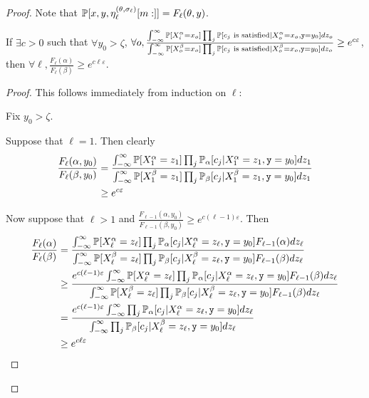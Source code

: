 \begin{proof}
Note that $\mathbb{P}[x, y, \eta_\ell^{(\theta, \sigma_\ell)}[m:]]=F_\ell(\theta, y)$.


\begin{lemma}\label{leakingcycleprivacyviolationlemma}
	If $\exists c>0$ such that $\forall y_0>\zeta$, $\forall o, \frac{\int_{-\infty}^\infty\mathbb{P}[X_i^\alpha=x_o]\prod_j \mathbb{P}[c_j\text{ is satisfied}|X_o^\alpha = x_o, \texttt{y}=y_0]dz_o}{\int_{-\infty}^\infty\mathbb{P}[X_o^\beta=x_o]\prod_j \mathbb{P}[c_j\text{ is satisfied}|X_o^\beta = x_o, \texttt{y}=y_0]dz_o}\geq e^{c\varepsilon}$, then $\forall \ell, \frac{F_\ell(\alpha)}{F_\ell(\beta)}\geq e^{c\ell\varepsilon}$. 
\end{lemma}
\begin{proof}
	This follows immediately from induction on $\ell$:

	Fix $y_0> \zeta$. 

	Suppose that $\ell = 1$. Then clearly \begin{align*}
		\frac{F_\ell(\alpha, y_0)}{F_\ell(\beta, y_0)} &= \frac{\int_{-\infty}^\infty \mathbb{P}[X_1^\alpha=z_1]\prod_j \mathbb{P}_\alpha[c_j|X_1^\alpha = z_1, \texttt{y}=y_0]dz_1}{\int_{-\infty}^\infty \mathbb{P}[X_1^\beta=z_1]\prod_j \mathbb{P}_\beta[c_j|X_1^\beta = z_1, \texttt{y}=y_0]dz_1}\\
		&\geq e^{c\varepsilon}
	\end{align*}

	Now suppose that $\ell>1$ and $\frac{F_{\ell-1}(\alpha, y_0)}{F_{\ell-1}(\beta, y_0)}\geq e^{c(\ell-1)\varepsilon}$. Then \begin{align*}
		\frac{F_\ell(\alpha)}{F_\ell(\beta)} &= \frac{\int_{-\infty}^\infty \mathbb{P}[X_\ell^\alpha=z_\ell]\prod_j \mathbb{P}_\alpha[c_j|X_\ell^\alpha = z_\ell, \texttt{y}=y_0]F_{\ell-1}(\alpha)dz_\ell}{\int_{-\infty}^\infty \mathbb{P}[X_\ell^\beta=z_\ell]\prod_j \mathbb{P}_\beta[c_j|X_\ell^\beta = z_\ell, \texttt{y}=y_0]F_{\ell-1}(\beta)dz_\ell}\\
		&\geq \frac{e^{c(\ell-1)\varepsilon}\int_{-\infty}^\infty \mathbb{P}[X_\ell^\alpha=z_\ell]\prod_j \mathbb{P}_\alpha[c_j|X_\ell^\alpha = z_\ell, \texttt{y}=y_0]F_{\ell-1}(\beta)dz_\ell}{\int_{-\infty}^\infty \mathbb{P}[X_\ell^\beta=z_\ell]\prod_j \mathbb{P}_\beta[c_j|X_\ell^\beta = z_\ell, \texttt{y}=y_0]F_{\ell-1}(\beta)dz_\ell}\\
		&= \frac{e^{c(\ell-1)\varepsilon}\int_{-\infty}^\infty \prod_j \mathbb{P}_\alpha[c_j|X_\ell^\alpha = z_\ell, \texttt{y}=y_0]dz_\ell}{\int_{-\infty}^\infty \prod_j \mathbb{P}_\beta[c_j|X_\ell^\beta = z_\ell, \texttt{y}=y_0]dz_\ell}\\
		&\geq e^{c\ell\varepsilon}
	\end{align*}
\end{proof}


\end{proof}
